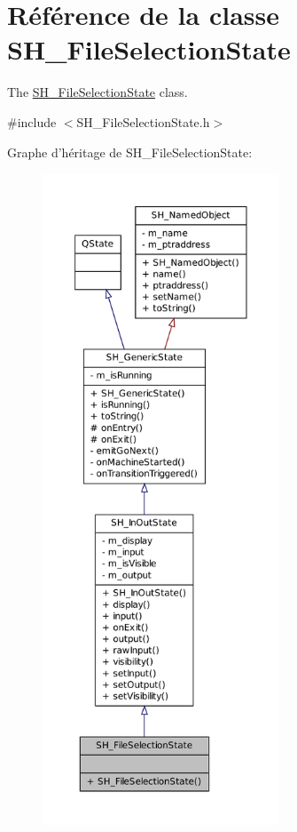 \hypertarget{classSH__FileSelectionState}{\section{Référence de la classe S\-H\-\_\-\-File\-Selection\-State}
\label{classSH__FileSelectionState}
}


The \hyperlink{classSH__FileSelectionState}{S\-H\-\_\-\-File\-Selection\-State} class.  




{\ttfamily \#include $<$S\-H\-\_\-\-File\-Selection\-State.\-h$>$}



Graphe d'héritage de S\-H\-\_\-\-File\-Selection\-State\-:
\nopagebreak
\begin{figure}[H]
\begin{center}
\leavevmode
\includegraphics[height=550pt]{classSH__FileSelectionState__inherit__graph}
\end{center}
\end{figure}



